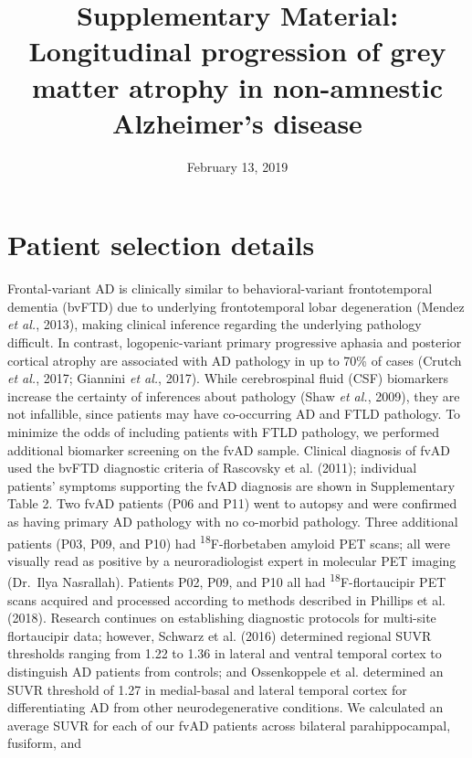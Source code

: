 \documentclass[]{article}
\title{Supplementary Material: Longitudinal progression of grey matter atrophy
in non-amnestic Alzheimer's disease}
\author{}
\date{February 13, 2019}
\begin{document}
\maketitle

\captionsetup{labelformat=empty}

\section*{Patient selection details}\label{patient-selection-details}

Frontal-variant AD is clinically similar to behavioral-variant
frontotemporal dementia (bvFTD) due to underlying frontotemporal lobar
degeneration (Mendez \emph{et al.}, 2013), making clinical inference
regarding the underlying pathology difficult. In contrast,
logopenic-variant primary progressive aphasia and posterior cortical
atrophy are associated with AD pathology in up to 70\% of cases (Crutch
\emph{et al.}, 2017; Giannini \emph{et al.}, 2017). While cerebrospinal
fluid (CSF) biomarkers increase the certainty of inferences about
pathology (Shaw \emph{et al.}, 2009), they are not infallible, since
patients may have co-occurring AD and FTLD pathology. To minimize the
odds of including patients with FTLD pathology, we performed additional
biomarker screening on the fvAD sample. Clinical diagnosis of fvAD used
the bvFTD diagnostic criteria of Rascovsky et al. (2011); individual
patients' symptoms supporting the fvAD diagnosis are shown in
Supplementary Table 2. Two fvAD patients (P06 and P11) went to autopsy
and were confirmed as having primary AD pathology with no co-morbid
pathology. Three additional patients (P03, P09, and P10) had
\textsuperscript{18}F-florbetaben amyloid PET scans; all were visually
read as positive by a neuroradiologist expert in molecular PET imaging
(Dr.~Ilya Nasrallah). Patients P02, P09, and P10 all had
\textsuperscript{18}F-flortaucipir PET scans acquired and processed
according to methods described in Phillips et al. (2018). Research
continues on establishing diagnostic protocols for multi-site
flortaucipir data; however, Schwarz et al. (2016) determined regional
SUVR thresholds ranging from 1.22 to 1.36 in lateral and ventral
temporal cortex to distinguish AD patients from controls; and
Ossenkoppele et al. determined an SUVR threshold of 1.27 in medial-basal
and lateral temporal cortex for differentiating AD from other
neurodegenerative conditions. We calculated an average SUVR for each of
our fvAD patients across bilateral parahippocampal, fusiform, and
\end{document}
